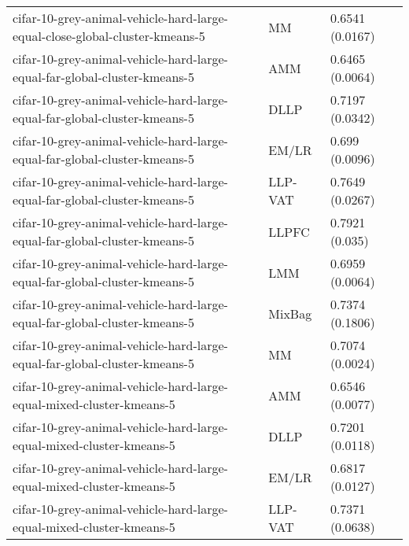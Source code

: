 \begin{longtable}{lll}
                                  cifar-10-grey-animal-vehicle-hard-large-equal-close-global-cluster-kmeans-5 &        MM &                       0.6541 (0.0167) \\
                                    cifar-10-grey-animal-vehicle-hard-large-equal-far-global-cluster-kmeans-5 &       AMM &                       0.6465 (0.0064) \\
                                    cifar-10-grey-animal-vehicle-hard-large-equal-far-global-cluster-kmeans-5 &      DLLP &                       0.7197 (0.0342) \\
                                    cifar-10-grey-animal-vehicle-hard-large-equal-far-global-cluster-kmeans-5 &     EM/LR &                        0.699 (0.0096) \\
                                    cifar-10-grey-animal-vehicle-hard-large-equal-far-global-cluster-kmeans-5 &   LLP-VAT &                       0.7649 (0.0267) \\
                                    cifar-10-grey-animal-vehicle-hard-large-equal-far-global-cluster-kmeans-5 &     LLPFC &                        0.7921 (0.035) \\
                                    cifar-10-grey-animal-vehicle-hard-large-equal-far-global-cluster-kmeans-5 &       LMM &                       0.6959 (0.0064) \\
                                    cifar-10-grey-animal-vehicle-hard-large-equal-far-global-cluster-kmeans-5 &    MixBag &                       0.7374 (0.1806) \\
                                    cifar-10-grey-animal-vehicle-hard-large-equal-far-global-cluster-kmeans-5 &        MM &                       0.7074 (0.0024) \\
                                         cifar-10-grey-animal-vehicle-hard-large-equal-mixed-cluster-kmeans-5 &       AMM &                       0.6546 (0.0077) \\
                                         cifar-10-grey-animal-vehicle-hard-large-equal-mixed-cluster-kmeans-5 &      DLLP &                       0.7201 (0.0118) \\
                                         cifar-10-grey-animal-vehicle-hard-large-equal-mixed-cluster-kmeans-5 &     EM/LR &                       0.6817 (0.0127) \\
                                         cifar-10-grey-animal-vehicle-hard-large-equal-mixed-cluster-kmeans-5 &   LLP-VAT &                       0.7371 (0.0638) \\

\end{longtable}
